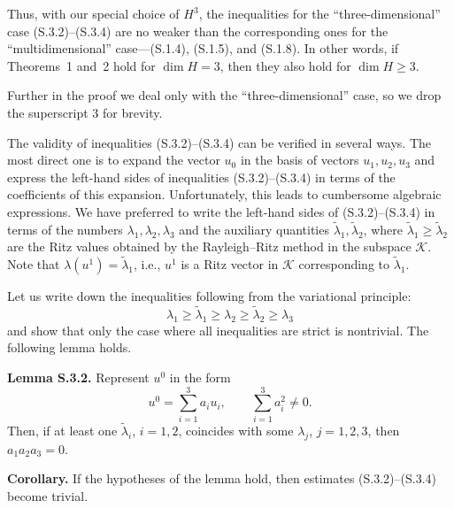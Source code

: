 \documentclass[11pt,oneside]{book}
\begin{document}
Thus, with our special choice of $H^3$, the inequalities for the ``three-dimensional'' case (S.3.2)--(S.3.4) are no weaker than the corresponding ones for the ``multidimensional'' case---(S.1.4), (S.1.5), and (S.1.8). In other words, if Theorems~1 and~2 %
hold for $\dim H = 3$, then they also hold for $\dim H \geqslant 3$.

Further in the proof we deal only with the ``three-dimensional'' case, so we drop the superscript $3$ for brevity.

The validity of inequalities (S.3.2)--(S.3.4) can be verified in several ways. The most direct one is to expand the vector $u_0$ %
in the basis of vectors $u_1, u_2, u_3$ and express the left-hand sides of inequalities (S.3.2)--(S.3.4) in terms of the coefficients of this expansion. Unfortunately, this leads to cumbersome algebraic expressions. We have preferred to write the left-hand sides of (S.3.2)--(S.3.4) in terms of the numbers $\lambda_1, \lambda_2, \lambda_3$ and the auxiliary quantities $\tilde{\lambda}_1, \tilde{\lambda}_2$, where $\tilde{\lambda}_1 \geqslant \tilde{\lambda}_2$ are the Ritz values obtained by the Rayleigh--Ritz method in the subspace $\mathcal{K}$. Note that $\lambda(u^1) = \tilde{\lambda}_1$, i.e., $u^1$ is a Ritz vector in $\mathcal{K}$ corresponding to $\tilde{\lambda}_1$.

Let us write down the inequalities following from the variational principle:
\[
\lambda_1 \geqslant \tilde{\lambda}_1 \geqslant \lambda_2 \geqslant \tilde{\lambda}_2 \geqslant \lambda_3
\]
and show that only the case where all inequalities are strict is nontrivial. The following lemma holds.

\textbf{Lemma S.3.2.} Represent $u^0$ in the form
\[
u^0 = \sum_{i=1}^3 a_i u_i, \qquad \sum_{i=1}^3 a_i^2 \neq 0.
\]
Then, if at least one $\tilde{\lambda}_i$, $i = 1, 2$, coincides with some $\lambda_j$, $j = 1, 2, 3$, then $a_1 a_2 a_3 = 0$.

\textbf{Corollary.} If the hypotheses of the lemma hold, then estimates (S.3.2)--(S.3.4) become trivial.
\end{document}
